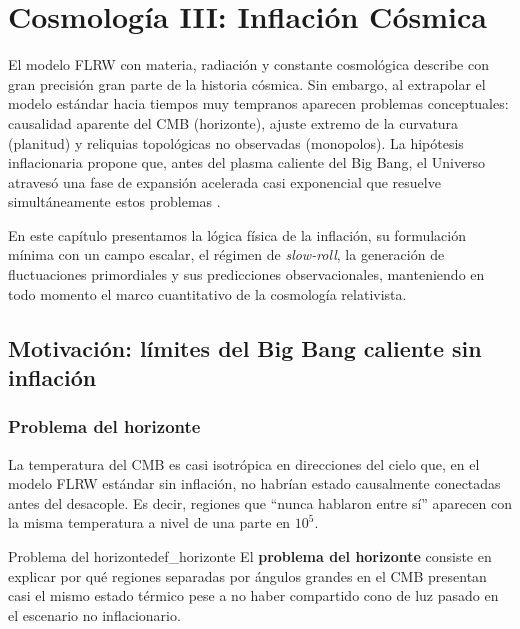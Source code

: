 
\chapter{Cosmología III: Inflación Cósmica}
\label{cap:inflacion}

El modelo FLRW con materia, radiación y constante cosmológica describe con gran precisión gran parte de la historia cósmica. Sin embargo, al extrapolar el modelo estándar hacia tiempos muy tempranos aparecen problemas conceptuales: causalidad aparente del CMB (horizonte), ajuste extremo de la curvatura (planitud) y reliquias topológicas no observadas (monopolos). La hipótesis inflacionaria propone que, antes del plasma caliente del Big Bang, el Universo atravesó una fase de expansión acelerada casi exponencial que resuelve simultáneamente estos problemas \cite{Guth1981, Linde1982, Kolb1990, Dodelson2003, Weinberg2008}.

En este capítulo presentamos la lógica física de la inflación, su formulación mínima con un campo escalar, el régimen de \emph{slow-roll}, la generación de fluctuaciones primordiales y sus predicciones observacionales, manteniendo en todo momento el marco cuantitativo de la cosmología relativista.

\section{Motivación: límites del Big Bang caliente sin inflación}
\label{sec:motivacion_inflacion}

\subsection{Problema del horizonte}

La temperatura del CMB es casi isotrópica en direcciones del cielo que, en el modelo FLRW estándar sin inflación, no habrían estado causalmente conectadas antes del desacople. Es decir, regiones que ``nunca hablaron entre sí'' aparecen con la misma temperatura a nivel de una parte en $10^5$.

\begin{definicion}{Problema del horizonte}{def_horizonte}
El \textbf{problema del horizonte} consiste en explicar por qué regiones separadas por ángulos grandes en el CMB presentan casi el mismo estado térmico pese a no haber compartido cono de luz pasado en el escenario no inflacionario.
\end{definicion}

